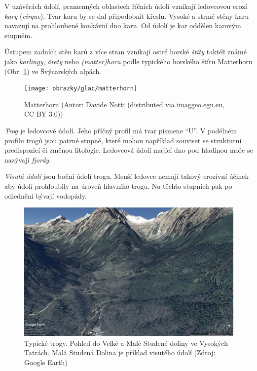 V uzávěrách údolí, pramenných oblastech říčních údolí vznikají ledovcovou erozí \emph{kary} (\textit{cirque}). Tvar karu by se dal připodobnit křeslu. Vysoké a strmé stěny karu navazují na prohloubené konkávní dno karu. Od údolí je kar oddělen karovým stupněm.

Ústupem zadních stěn karů z více stran vznikají ostré horské \emph{štíty} taktéž známé jako \emph{karlingy}, \emph{\^{a}rety} nebo \emph{(matter)horn} podle typického horského štítu Matterhorn (Obr. \ref{fig:matterhorn}) ve Švýcarských alpách.

\begin{figure}
	\centering
	\texttt{[image: obrazky/glac/matterhorn]}
	\caption{Matterhorn (Autor: Davide Notti (distributed via imaggeo.egu.eu, CC BY 3.0))}
	\label{fig:matterhorn}
\end{figure}

\emph{Trog} je ledovcové údolí. Jeho příčný profil má tvar písmene \enquote{U}. V podélném profilu trogů jsou patrné stupně, které mohou například souviset se strukturní predispozicí či změnou litologie. Ledovcová údolí mající dno pod hladinou moře se nazývají \emph{fjordy}.

\emph{Visutá údolí} jsou boční údolí trogu. Menší ledovce nemají takový erozivní účinek aby údolí prohloubily na úroveň hlavního trogu. Na těchto stupních pak po odlednění bývají vodopády.

\begin{figure}
	\centering
	\includegraphics[width=1\linewidth]{obrazky/glac/studena}
	\caption{Typické trogy. Pohled do Velké a Malé Studené doliny ve Vysokých Tatrách. Malá Studená Dolina je příklad visutého údolí (Zdroj: Google Earth)}
	\label{fig:studena}
\end{figure}

